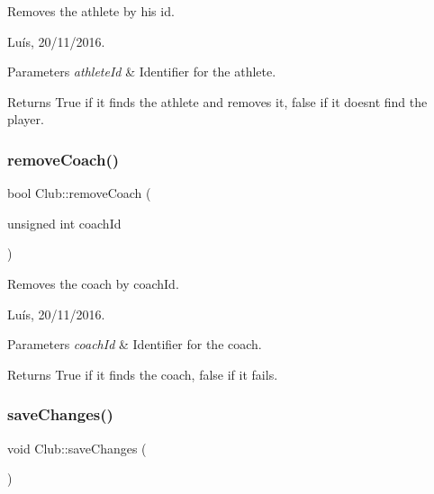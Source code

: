 Removes the athlete by his id. 

Luís, 20/11/2016. 


\begin{DoxyParams}{Parameters}
{\em athlete\+Id} & Identifier for the athlete. \\
\hline
\end{DoxyParams}


\begin{DoxyReturn}{Returns}
True if it finds the athlete and removes it, false if it doesn\textquotesingle{}t find the player. 
\end{DoxyReturn}
\hypertarget{class_club_adf82412445e01740989ee1956b13a556}{}\label{class_club_adf82412445e01740989ee1956b13a556} 
\subsubsection{\texorpdfstring{remove\+Coach()}{removeCoach()}}
{\footnotesize\ttfamily bool Club\+::remove\+Coach (\begin{DoxyParamCaption}\item[{unsigned int}]{coach\+Id }\end{DoxyParamCaption})}



Removes the coach by coach\+Id. 

Luís, 20/11/2016. 


\begin{DoxyParams}{Parameters}
{\em coach\+Id} & Identifier for the coach. \\
\hline
\end{DoxyParams}


\begin{DoxyReturn}{Returns}
True if it finds the coach, false if it fails. 
\end{DoxyReturn}
\hypertarget{class_club_ad6b354484c2c621378e130388384df21}{}\label{class_club_ad6b354484c2c621378e130388384df21} 
\subsubsection{\texorpdfstring{save\+Changes()}{saveChanges()}}
{\footnotesize\ttfamily void Club\+::save\+Changes (\begin{DoxyParamCaption}{ }\end{DoxyParamCaption})}



